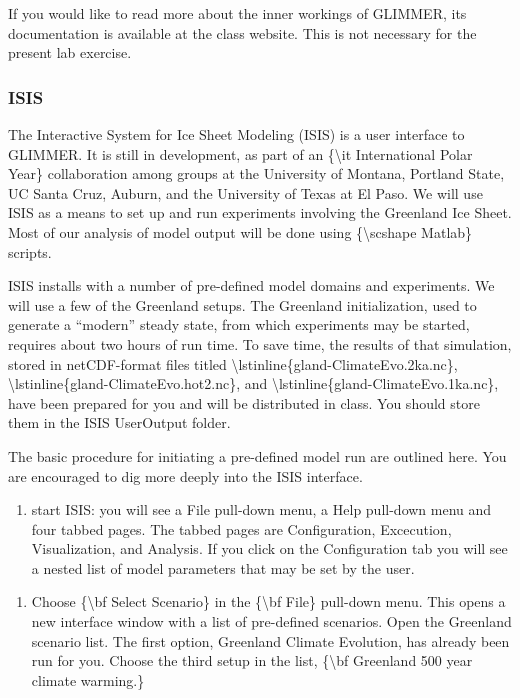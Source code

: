 If you would like to read more about the inner workings of GLIMMER, its
documentation is available at the class website. This is not necessary
for the present lab exercise.

\subsubsection{ISIS}

The Interactive System for Ice Sheet Modeling (ISIS) is a user interface
to GLIMMER. It is still in development, as part of an
\{\textbackslash{}it International Polar Year\} collaboration among
groups at the University of Montana, Portland State, UC Santa Cruz,
Auburn, and the University of Texas at El Paso. We will use ISIS as a
means to set up and run experiments involving the Greenland Ice Sheet.
Most of our analysis of model output will be done using
\{\textbackslash{}scshape Matlab\} scripts.

ISIS installs with a number of pre-defined model domains and
experiments. We will use a few of the Greenland setups. The Greenland
initialization, used to generate a ``modern'' steady state, from which
experiments may be started, requires about two hours of run time. To
save time, the results of that simulation, stored in netCDF-format files
titled \textbackslash{}lstinline\{gland-ClimateEvo.2ka.nc\},
\textbackslash{}lstinline\{gland-ClimateEvo.hot2.nc\}, and
\textbackslash{}lstinline\{gland-ClimateEvo.1ka.nc\}, have been prepared
for you and will be distributed in class. You should store them in the
ISIS UserOutput folder.

The basic procedure for initiating a pre-defined model run are outlined
here. You are encouraged to dig more deeply into the ISIS interface.

\begin{enumerate}
\itemsep1pt\parskip0pt
\item
  start ISIS: you will see a File pull-down menu, a Help pull-down menu
  and four tabbed pages. The tabbed pages are Configuration, Excecution,
  Visualization, and Analysis. If you click on the Configuration tab you
  will see a nested list of model parameters that may be set by the
  user.
\end{enumerate}

\begin{enumerate}
\itemsep1pt\parskip0pt
\item
  Choose \{\textbackslash{}bf Select Scenario\} in the
  \{\textbackslash{}bf File\} pull-down menu. This opens a new interface
  window with a list of pre-defined scenarios. Open the Greenland
  scenario list. The first option, Greenland Climate Evolution, has
  already been run for you. Choose the third setup in the list,
  \{\textbackslash{}bf Greenland 500 year climate warming.\}
\end{enumerate}

